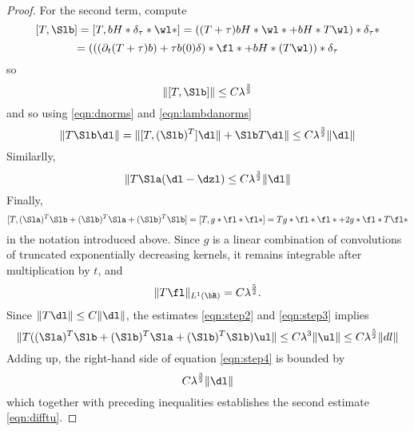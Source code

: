 \begin{proof}
For the second term, compute
\[
  [T, \Slb] = [T,bH*\delta_{\tau}*\wl*] = ((T+\tau)bH*\wl*
  + bH*T\wl)*\delta_{\tau}*
\]
\[
  = (((\partial_t (T+\tau)b) + \tau
  b(0)\delta)* \fl * + bH*(T\wl))*\delta_{\tau}
\]
so
\[
  \|[T,\Slb]\| \le C\lambda^{\frac{3}{2}}
\]
and so using \ref{eqn:dnorms} and \ref{eqn:lambdanorms}
\[
\|T\Slb \dl \|=  \|[T,(\Slb)^T]\dl \|+ \Slb T\dl\| \le C\lambda^{\frac{3}{2}}\|\dl\|
\]
Similarlly,
\[
\|T\Sla (\dl-\dzl) \le C \lambda^{\frac{3}{2}}\|\dl\|
\]
Finally,
\[
  [T, (\Sla)^T\Slb + (\Slb)^T\Sla + (\Slb)^T\Slb] = [T,g*\fl*\fl*] =
  Tg*\fl*\fl* + 2 g*\fl*T\fl*
\]
in the notation introduced above. Since $g$ is a linear combination of
convolutions of truncated exponentially decreasing kernels, it remains
integrable after multiplication by $t$, and
\[
\|T\fl\|_{L^1(\bR)} = C\lambda^{\frac{5}{2}}. 
\]
Since $\|T\dl\| \le C\|\dl\|$, the estimates \ref{eqn:step2} and \ref{eqn:step3} implies
\[
  \|T ((\Sla)^T\Slb + (\Slb)^T\Sla + (\Slb)^T\Slb)\ul\| \le
  C\lambda^{3}\|\ul\| \le C\lambda^{\frac{5}{2}} \|dl\|
\]
Adding up, the right-hand side of equation \ref{eqn:step4} is bounded
by
\[
  C \lambda^{\frac{3}{2}}\|\dl\|
\]
which together with preceding inequalities establishes the second estimate \ref{eqn:difftu}.

\end{proof}

